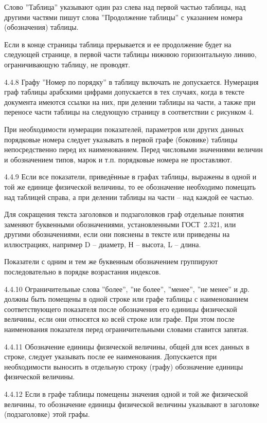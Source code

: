 Слово ''Таблица'' указывают один раз слева над первой частью таблицы, над другими частями пишут слова ''Продолжение таблицы'' с указанием номера (обозначения) таблицы.

Если в конце страницы таблица прерывается и ее продолжение будет на следующей странице, в первой части таблицы нижнюю горизонтальную линию, ограничивающую таблицу, не проводят.

4.4.8 Графу ''Номер по порядку'' в таблицу включать не допускается. Нумерация граф таблицы арабскими цифрами допускается в тех случаях, когда в тексте документа имеются ссылки на них, при делении таблицы на части, а также при переносе части таблицы на следующую страницу в соответствии с рисунком 4.

При необходимости нумерации показателей, параметров или других данных порядковые номера следует указывать в первой графе (боковике) таблицы непосредственно перед их наименованием. Перед числовыми значениями величин и обозначением типов, марок и т.п. порядковые номера не
проставляют.

4.4.9 Если все показатели, приведённые в графах таблицы, выражены в одной и той же единице физической величины, то ее обозначение необходимо помещать над таблицей справа, а при делении таблицы на части – над каждой ее частью.

Для сокращения текста заголовков и подзаголовков граф отдельные понятия заменяют буквенными
обозначениями, установленными ГОСТ~2.321, или другими обозначениями, если они пояснены в тексте или приведены на иллюстрациях, например D – диаметр, Н – высота, L – длина.

Показатели с одним и тем же буквенным обозначением группируют последовательно в порядке возрастания индексов.

4.4.10 Ограничительные слова ''более'', ''не более'', ''менее'', ''не менее'' и др. должны быть помещены в одной строке или графе таблицы с наименованием соответствующего показателя после обозначения его единицы физической величины, если они относятся ко всей строке или графе. При этом после наименования показателя перед ограничительными словами ставится запятая.

4.4.11 Обозначение единицы физической величины, общей для всех данных в строке, следует указывать после ее наименования. Допускается при необходимости выносить в отдельную строку (графу) обозначение единицы физической величины.

4.4.12 Если в графе таблицы помещены значения одной и той же физической величины, то обозначение единицы физической величины указывают в заголовке (подзаголовке) этой графы.

